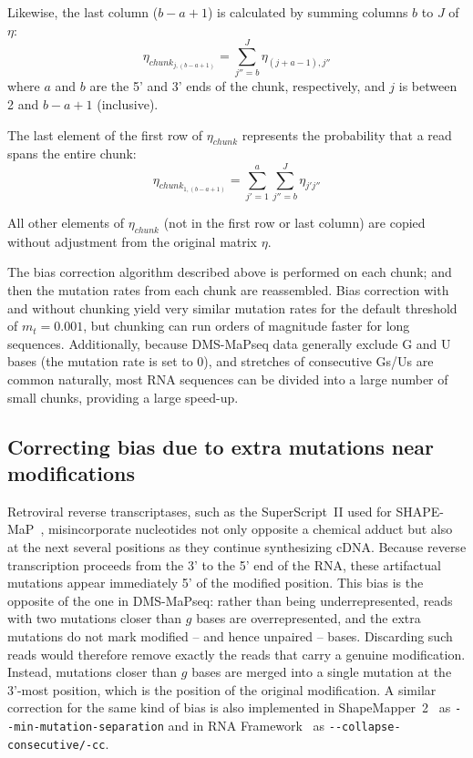 \documentclass{article}
\begin{document}
Likewise, the last column ($b-a+1$) is calculated by summing columns $b$ to $J$ of $\eta$:
\begin{equation}
    \eta_{chunk_{j,(b-a+1)}} = \sum_{j''=b}^J{\eta_{(j+a-1),j''}}
\end{equation}
where $a$ and $b$ are the 5' and 3' ends of the chunk, respectively, and $j$ is between 2 and $b-a+1$ (inclusive).

The last element of the first row of $\eta_{chunk}$ represents the probability that a read spans the entire chunk:
\begin{equation}
    \eta_{chunk_{1,(b-a+1)}} = \sum_{j'=1}^a{\sum_{j''=b}^J{\eta_{j'j''}}}
\end{equation}

All other elements of $\eta_{chunk}$ (not in the first row or last column) are copied without adjustment from the original matrix $\eta$.

The bias correction algorithm described above is performed on each chunk; and then the mutation rates from each chunk are reassembled.
Bias correction with and without chunking yield very similar mutation rates for the default threshold of $m_t = 0.001$, but chunking can run orders of magnitude faster for long sequences.
Additionally, because DMS-MaPseq data generally exclude G and U bases (the mutation rate is set to 0), and stretches of consecutive Gs/Us are common naturally, most RNA sequences can be divided into a large number of small chunks, providing a large speed-up.


\subsection{Correcting bias due to extra mutations near modifications}
\label{merge-correction-algorithm}

Retroviral reverse transcriptases, such as the SuperScript~II used for SHAPE-MaP~\cite{Siegfried2014}, misincorporate nucleotides not only opposite a chemical adduct but also at the next several positions as they continue synthesizing cDNA.
Because reverse transcription proceeds from the 3' to the 5' end of the RNA, these artifactual mutations appear immediately 5' of the modified position.
This bias is the opposite of the one in DMS-MaPseq: rather than being underrepresented, reads with two mutations closer than $g$ bases are overrepresented, and the extra mutations do not mark modified -- and hence unpaired -- bases.
Discarding such reads would therefore remove exactly the reads that carry a genuine modification.
Instead, mutations closer than $g$ bases are merged into a single mutation at the 3'-most position, which is the position of the original modification.
A similar correction for the same kind of bias is also implemented in ShapeMapper~2~\cite{Busan2018} as \verb|--min-mutation-separation| and in RNA Framework~\cite{Incarnato2018} as \verb|--collapse-consecutive/-cc|.
\end{document}
